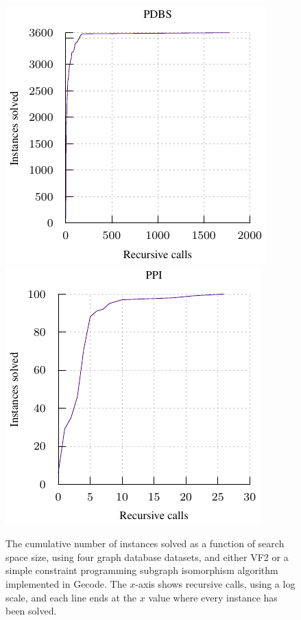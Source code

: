 \documentclass[twoside,11pt]{article}
\begin{document}
\begin{figure}[t]
    \centering
    \hspace*{1em}
    \includegraphics*{plots/biiiig-data-pdbs.pdf}
    \hfill
    \includegraphics*{plots/biiiig-data-ppigo.pdf}
    \hspace*{1em}

    \caption{The cumulative number of instances solved as a function of search space size, using four
    graph database datasets, and either VF2 or a simple constraint programming subgraph isomorphism
    algorithm implemented in Gecode. The $x$-axis shows recursive calls, using a log scale, and each
    line ends at the $x$ value where every instance has been solved.}
    \label{figure:biiiig-data}
\end{figure}
\end{document}
